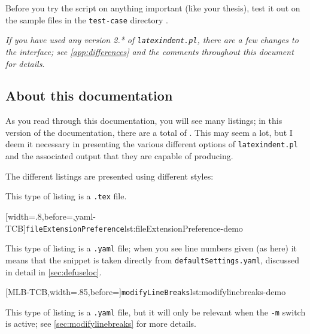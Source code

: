 	\begin{warning}
		Before you try the script on anything important (like your thesis), test it out on the
		sample files in the \texttt{test-case} directory \cite{latexindent-home}.
	\end{warning}

	\emph{If you have used any version 2.* of \texttt{latexindent.pl}, there
		are a few changes to the interface; see \vref{app:differences} and the comments
		throughout this document for details}.

\subsection{About this documentation}
	As you read through this documentation, you will see many listings; in this version of
	the documentation, there are a total of \totallstlistings. This may seem a lot, but I
	deem it necessary in presenting the various different options of \texttt{latexindent.pl}
	and the associated output that they are capable of producing.

	The different listings are presented using different styles:

	\begin{minipage}{.4\textwidth}
	\end{minipage}%
	\hfill
	\begin{minipage}{.4\textwidth}
		This type of listing is a \texttt{.tex} file.
	\end{minipage}%

	\begin{minipage}{.4\textwidth}
		[width=.8\linewidth,before=\centering,yaml-TCB]{\texttt{fileExtensionPreference}}{lst:fileExtensionPreference-demo}
	\end{minipage}%
	\hfill
	\begin{minipage}{.4\textwidth}
		This type of listing is a \texttt{.yaml} file; when you see line numbers given (as here)
		it means that the snippet is taken directly from \texttt{defaultSettings.yaml}, discussed in
		detail in \vref{sec:defuseloc}.
	\end{minipage}%

	\begin{minipage}{.55\textwidth}
		[MLB-TCB,width=.85\linewidth,before=\centering]{\texttt{modifyLineBreaks}}{lst:modifylinebreaks-demo}
	\end{minipage}%
	\hfill
	\begin{minipage}{.4\textwidth}
		This type of listing is a \texttt{.yaml} file, but it will only
		be relevant when the \texttt{-m} switch is active; see \vref{sec:modifylinebreaks}
		for more details.
	\end{minipage}%

